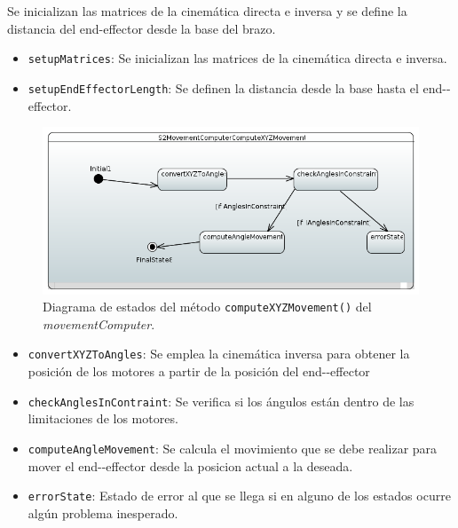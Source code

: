 Se inicializan las matrices de la cinemática directa e inversa y se define la distancia del end-effector desde la base del brazo.

\begin{itemize}
    \item \texttt{setupMatrices}: Se inicializan las matrices de la cinemática directa e inversa.
    \item \texttt{setupEndEffectorLength}: Se definen la distancia desde la base hasta el \ac{end--effector}.
\end{itemize}

\begin{figure}[H]
    \centering
    \includegraphics[width=1\linewidth]{pictures/S2MovementComputerComputeXYZMovement.PNG}
    \caption{Diagrama de estados del método \texttt{computeXYZMovement()} del \textit{movementComputer}.}
    \label{fig:fun_compute_xyz_movement_movement_computer}
\end{figure}

\begin{itemize}
    \item \texttt{convertXYZToAngles}: Se emplea la cinemática inversa para obtener la posición de los motores a partir de la posición del \ac{end--effector}
    \item \texttt{checkAnglesInContraint}: Se verifica si los ángulos están dentro de las limitaciones de los motores.
    \item \texttt{computeAngleMovement}: Se calcula el movimiento que se debe realizar para mover el \ac{end--effector} desde la posicion actual a la deseada.
    \item \texttt{errorState}: Estado de error al que se llega si en alguno de los estados ocurre algún problema inesperado. 
\end{itemize}

